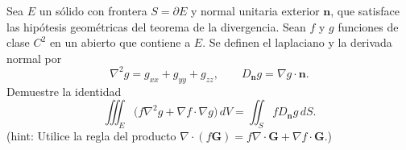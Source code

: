 ﻿Sea $E$ un sólido con frontera $S=\partial E$ y normal unitaria exterior $\mathbf n$, que satisface las hipótesis geométricas del teorema de la divergencia. Sean $f$ y $g$ funciones de clase $C^2$ en un abierto que contiene a $E$. Se definen el laplaciano y la derivada normal por
\[
\nabla^2 g=g_{xx}+g_{yy}+g_{zz},
\qquad D_{\mathbf n}g=\nabla g\cdot\mathbf n.
\]
Demuestre la identidad
\[
\iiint_E\bigl(f\nabla^2g+\nabla f\cdot\nabla g\bigr)\,dV
=\iint_S fD_{\mathbf n}g\,dS.
\]
(hint: Utilice la regla del producto $\nabla\cdot(f\mathbf G)=f\nabla\cdot\mathbf G+\nabla f\cdot\mathbf G$.)
